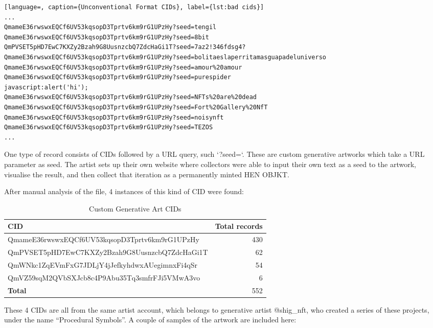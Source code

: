 \begin{lstlisting}[language=, caption={Unconventional Format CIDs}, label={lst:bad cids}] 
...
QmameE36rwswxEQCf6UV53kqsopD3Tprtv6km9rG1UPzHy?seed=tengil
QmameE36rwswxEQCf6UV53kqsopD3Tprtv6km9rG1UPzHy?seed=8bit
QmPVSET5pHD7EwC7KXZy2Bzah9G8UusnzcbQ7ZdcHaGi1T?seed=7az2!346fdsg4?
QmameE36rwswxEQCf6UV53kqsopD3Tprtv6km9rG1UPzHy?seed=bolitaeslaperritamasguapadeluniverso
QmameE36rwswxEQCf6UV53kqsopD3Tprtv6km9rG1UPzHy?seed=amour%20amour
QmameE36rwswxEQCf6UV53kqsopD3Tprtv6km9rG1UPzHy?seed=purespider
javascript:alert('hi');
QmameE36rwswxEQCf6UV53kqsopD3Tprtv6km9rG1UPzHy?seed=NFTs%20are%20dead
QmameE36rwswxEQCf6UV53kqsopD3Tprtv6km9rG1UPzHy?seed=Fort%20Gallery%20NfT
QmameE36rwswxEQCf6UV53kqsopD3Tprtv6km9rG1UPzHy?seed=noisynft
QmameE36rwswxEQCf6UV53kqsopD3Tprtv6km9rG1UPzHy?seed=TEZOS
...
\end{lstlisting}

One type of record consists of CIDs followed by a URL query, such `?seed=`. These are custom generative artworks which take a URL parameter as seed. The artist sets up their own website where collectors were able to input their own text as a seed to the artwork, visualise the result, and then collect that iteration as a permanently minted HEN OBJKT.

After manual analysis of the file, 4 instances of this kind of CID were found:


\begin{table}[h]
\footnotesize
\centering
\begin{tabular}{|l|r|}
\hline
\textbf{CID} & \textbf{Total records} \\ \hline
QmameE36rwswxEQCf6UV53kqsopD3Tprtv6km9rG1UPzHy	                & 430                         \\ \hline
QmPVSET5pHD7EwC7KXZy2Bzah9G8UusnzcbQ7ZdcHaGi1T	            & 62                         \\ \hline
QmWNkc1ZqEVmFxG7JDLjY4jJefkyhdwxAUegimnxFi4qSr       & 54               \\ \hline
QmVZ59sqM2QVbSXJcb8c4P9Abu35Tq3smfrFJi5VMwA3vo      & 6               \\ \hline
\textbf{Total}      &       552         \\ \hline
\end{tabular}
\caption{Custom Generative Art CIDs}
\label{table:custom-generative-cids}
\end{table}

These 4 CIDs are all from the same artist account\footnotemark[4], which belongs to generative artist @shig\_nft\footnotemark[5] , who created a series of these projects, under the name ``Procedural Symbols''. A couple of samples of the artwork are included here:

